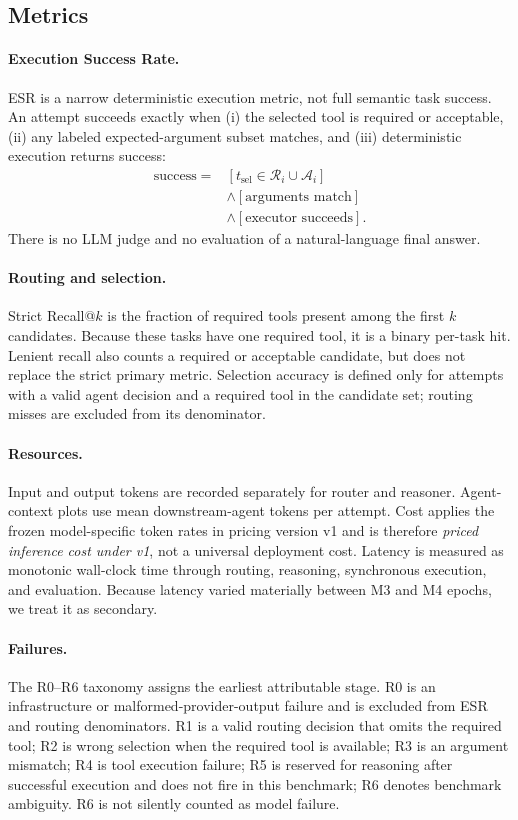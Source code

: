 \documentclass[10pt,twocolumn]{article}
\begin{document}
\subsection{Metrics}

\paragraph{Execution Success Rate.}
ESR is a narrow deterministic execution metric, not full semantic task success. An attempt succeeds exactly when (i) the selected tool is required or acceptable, (ii) any labeled expected-argument subset matches, and (iii) deterministic execution returns success:
\begin{align}
\mathrm{success}={}&[t_{\mathrm{sel}}\in \mathcal{R}_i\cup\mathcal{A}_i]\nonumber\\
&\land[\text{arguments match}]\nonumber\\
&\land[\text{executor succeeds}].
\end{align}
There is no LLM judge and no evaluation of a natural-language final answer.

\paragraph{Routing and selection.}
Strict Recall@$k$ is the fraction of required tools present among the first $k$ candidates. Because these tasks have one required tool, it is a binary per-task hit. Lenient recall also counts a required or acceptable candidate, but does not replace the strict primary metric. Selection accuracy is defined only for attempts with a valid agent decision and a required tool in the candidate set; routing misses are excluded from its denominator.

\paragraph{Resources.}
Input and output tokens are recorded separately for router and reasoner. Agent-context plots use mean downstream-agent tokens per attempt. Cost applies the frozen model-specific token rates in pricing version v1 and is therefore \emph{priced inference cost under v1}, not a universal deployment cost. Latency is measured as monotonic wall-clock time through routing, reasoning, synchronous execution, and evaluation. Because latency varied materially between M3 and M4 epochs, we treat it as secondary.

\paragraph{Failures.}
The R0--R6 taxonomy assigns the earliest attributable stage. R0 is an infrastructure or malformed-provider-output failure and is excluded from ESR and routing denominators. R1 is a valid routing decision that omits the required tool; R2 is wrong selection when the required tool is available; R3 is an argument mismatch; R4 is tool execution failure; R5 is reserved for reasoning after successful execution and does not fire in this benchmark; R6 denotes benchmark ambiguity. R6 is not silently counted as model failure.
\end{document}
